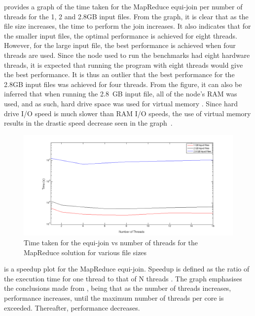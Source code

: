 \documentclass[12pt,twocolumn]{witseiepaper}
\begin{document}
 provides a graph of the time taken for the MapReduce equi-join per number of threads for the 1, 2 and 2.8GB input files. From the graph, it is clear that as the file size increases, the time to perform the join increases. It also indicates that for the smaller input files, the optimal performance is achieved for eight threads. However, for the large input file, the best performance is achieved when four threads are used. Since the node used to run the benchmarks had eight hardware threads, it is expected that running the program with eight threads would give the best performance. It is thus an outlier that the best performance for the 2.8GB input files was achieved for four threads. From the figure, it can also be inferred that when running the 2.8~GB input file, all of the node's RAM was used, and as such, hard drive space was used for virtual memory \cite{ram}. Since hard drive I/O speed is much slower than RAM I/O speeds, the use of virtual memory results in the drastic speed decrease seen in the graph~\cite{ram}.

\begin{figure}[h]
	\centering
	\includegraphics[width=1\columnwidth]{mapReduceTimevsThreads.png}
	\caption{Time taken for the equi-join vs number of threads for the MapReduce solution for various file sizes}
	\raggedright
	\label{fig:resultsMR}	
\end{figure}

 is a speedup plot for the MapReduce equi-join. Speedup is defined as the ratio of the execution time for one thread to that of N threads \cite{speedup}. The graph emphasises the conclusions made from , being that as the number of threads increases, performance increases, until the maximum number of threads per core is exceeded. Thereafter, performance decreases.
\end{document}
